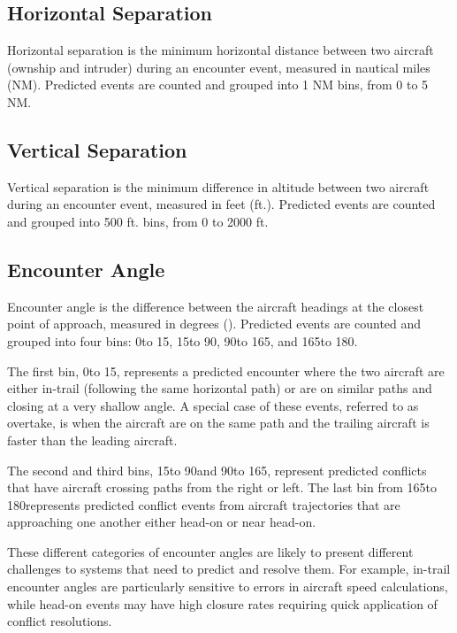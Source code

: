 \subsection{Horizontal Separation}
Horizontal separation is the minimum horizontal distance between two aircraft (ownship and intruder) during an encounter event, measured in nautical miles (NM). Predicted events are counted and grouped into 1 NM bins, from 0 to 5 NM.

\subsection{Vertical Separation}
Vertical separation is the minimum difference in altitude between two aircraft during an encounter event, measured in feet (ft.). Predicted events are counted and grouped into 500 ft. bins, from 0 to 2000 ft.

\subsection{Encounter Angle}
Encounter angle is the difference between the aircraft headings at the closest point of approach, measured in degrees (\textdegree). Predicted events are counted and grouped into four bins: 0\textdegree to 15\textdegree, 15\textdegree to 90\textdegree, 90\textdegree to 165\textdegree, and 165\textdegree to 180\textdegree. 

The first bin, 0\textdegree to 15\textdegree, represents a predicted encounter where the two aircraft are either in-trail (following the same horizontal path) or are on similar paths and closing at a very shallow angle. A special case of these events, referred to as overtake, is when the aircraft are on the same path and the trailing aircraft is faster than the leading aircraft.

The second and third bins, 15\textdegree to 90\textdegree and 90\textdegree to 165\textdegree, represent predicted conflicts that have aircraft crossing paths from the right or left. The last bin from 165\textdegree to 180\textdegree represents predicted conflict events from aircraft trajectories that are approaching one another either head-on or near head-on.

These different categories of encounter angles are likely to present different challenges to systems that need to predict and resolve them. For example, in-trail encounter angles are particularly sensitive to errors in aircraft speed calculations, while head-on events may have high closure rates requiring quick application of conflict resolutions.

